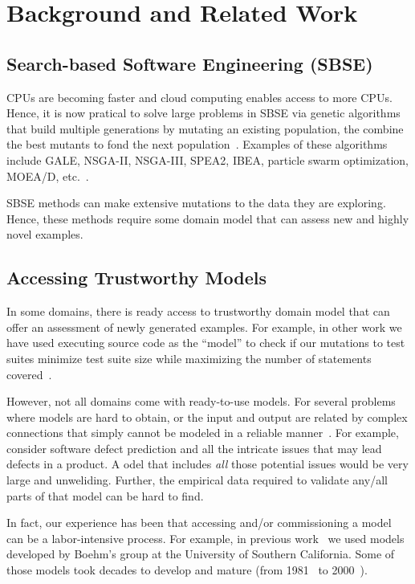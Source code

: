\documentclass[conference]{IEEEtran}
\begin{document}
\section{Background and Related Work}
\subsection{Search-based Software Engineering (SBSE)} CPUs are becoming
faster and cloud computing enables access to more CPUs. Hence, it is now pratical
to solve large problems in SBSE via 
genetic algorithms  that build multiple generations by  mutating  an existing population,  
the combine the best mutants to fond the next population~\cite{Harman2009,Harman2011}. Examples of these algorithms include GALE, NSGA-II, NSGA-III, SPEA2, IBEA, particle swarm optimization, MOEA/D, etc.~\cite{krall14,deb00a,zit02,zit04,%
deb14,Cui2005a,zhang07:TEC}.

SBSE methods can make extensive mutations to the data they are exploring. Hence, these methods
require some domain model that can assess new and highly novel examples.

\subsection{Accessing Trustworthy Models}

In some domains, there is ready access to 
trustworthy domain model that can offer an assessment
of newly generated examples. For example, in other work
we have used executing source code as the ``model'' to check
if our mutations to test suites
  minimize
test suite size while maximizing the number of statements covered~\cite{me09m,andrews07,andrews10}.

However, not all domains come with ready-to-use models.
For   several problems where models are hard to obtain, or the input and output are related by complex connections that simply cannot be modeled in a reliable manner~\cite{Ludewig2003}. For example, 
consider software defect prediction and all the intricate issues that may lead defects in a product. A odel that includes {\em all} those
potential issues would be very large and unweliding. Further,
the empirical data required to validate any/all parts
of that model can be hard to find.



In fact, our experience has been that accessing and/or commissioning
a model can be a labor-intensive process.
For  example, in previous work~\cite{me07f} we used models
developed by Boehm's group at the University of Southern California.
Some of those models took decades to develop and mature (from 1981~\cite{boehm81} to 2000~\cite{boehm00b}). 
\end{document}
